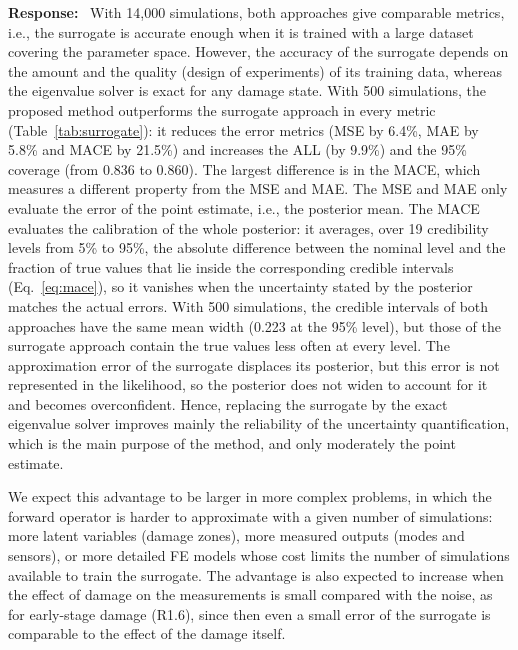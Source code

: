 \documentclass[11pt]{article}
\newenvironment{response}{\par\smallskip\noindent\color{resp}\textbf{Response:}\ }{\par}
\begin{document}
\begin{response}
	With 14,000 simulations, both approaches give comparable metrics, i.e., the surrogate is accurate enough when it is trained with a large dataset covering the parameter space. However, the accuracy of the surrogate depends on the amount and the quality (design of experiments) of its training data, whereas the eigenvalue solver is exact for any damage state. 
	With 500 simulations, the proposed method outperforms the surrogate approach in every metric (Table~\ref{tab:surrogate}): it reduces the error metrics (MSE by 6.4\%, MAE by 5.8\% and MACE by 21.5\%) and increases the ALL (by 9.9\%) and the 95\% coverage (from 0.836 to 0.860).
	The largest difference is in the MACE, which measures a different property from the MSE and MAE. The MSE and MAE only evaluate the error of the point estimate, i.e., the posterior mean. The MACE evaluates the calibration of the whole posterior: it averages, over 19 credibility levels from 5\% to 95\%, the absolute difference between the nominal level and the fraction of true values that lie inside the corresponding credible intervals (Eq.~\eqref{eq:mace}), so it vanishes when the uncertainty stated by the posterior matches the actual errors. With 500 simulations, the credible intervals of both approaches have the same mean width (0.223 at the 95\% level), but those of the surrogate approach contain the true values less often at every level. The approximation error of the surrogate displaces its posterior, but this error is not represented in the likelihood, so the posterior does not widen to account for it and becomes overconfident. Hence, replacing the surrogate by the exact eigenvalue solver improves mainly the reliability of the uncertainty quantification, which is the main purpose of the method, and only moderately the point estimate.

	We expect this advantage to be larger in more complex problems, in which the forward operator is harder to approximate with a given number of simulations: more latent variables (damage zones), more measured outputs (modes and sensors), or more detailed FE models whose cost limits the number of simulations available to train the surrogate. The advantage is also expected to increase when the effect of damage on the measurements is small compared with the noise, as for early-stage damage (R1.6), since then even a small error of the surrogate is comparable to the effect of the damage itself.



\end{response}
\end{document}
